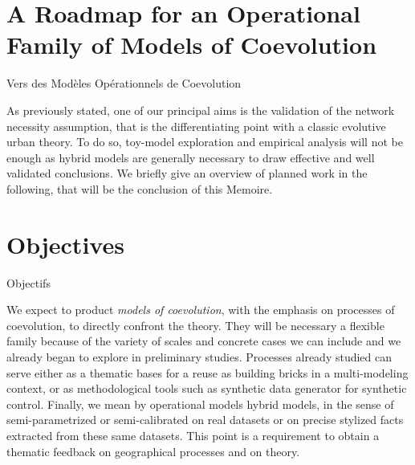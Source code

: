 



\section*{A Roadmap for an Operational Family of Models of Coevolution}{Vers des Modèles Opérationnels de Coevolution} %

\label{ch:operational}


As previously stated, one of our principal aims is the validation of the network necessity assumption, that is the differentiating point with a classic evolutive urban theory. To do so, toy-model exploration and empirical analysis will not be enough as hybrid models are generally necessary to draw effective and well validated conclusions. We briefly give an overview of planned work in the following, that will be the conclusion of this Memoire.






\section*{Objectives}{Objectifs}


We expect to product \emph{models of coevolution}, 
 with the emphasis on processes of coevolution, to directly confront the theory. They will be necessary a flexible family because of the variety of scales and concrete cases we can include and we already began to explore in preliminary studies. Processes already studied can serve either as a thematic bases for a reuse as building bricks in a multi-modeling context, or as methodological tools such as synthetic data generator for synthetic control. Finally, we mean by operational models hybrid models, in the sense of semi-parametrized or semi-calibrated on real datasets or on precise stylized facts extracted from these same datasets. This point is a requirement to obtain a thematic feedback on geographical processes and on theory.



